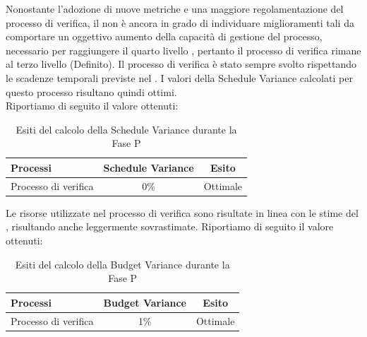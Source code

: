 	Nonostante l'adozione di nuove metriche e una maggiore regolamentazione del processo di verifica, il  non è ancora in grado di individuare miglioramenti tali da comportare un oggettivo aumento della capacità di gestione del processo, necessario per raggiungere il quarto livello , pertanto il processo di verifica rimane al terzo livello (Definito).
	Il processo di verifica è stato sempre svolto rispettando le scadenze temporali previste nel . I valori della Schedule Variance calcolati per questo processo risultano quindi ottimi.\\
			Riportiamo di seguito il valore ottenuti:
			\begin{table}[H]
				\centering
				\begin{tabu}{| l | c | c |}
					\hline
						Processi 							& Schedule Variance	& Esito		\\ \hline \hline
						Processo di verifica & 0\% & Ottimale \\ \hline
				\end{tabu}
				\caption{Esiti del calcolo della Schedule Variance durante la Fase P}
			\end{table}	

Le risorse utilizzate nel processo di verifica sono risultate in linea con le stime del , risultando anche leggermente sovrastimate.
Riportiamo di seguito il valore ottenuti:
\begin{table}[H]
	\centering
	\begin{tabu}{| l | c | c |}
	\hline
	Processi 							& Budget Variance	& Esito		\\ \hline \hline
	Processo di verifica & 1\% & Ottimale \\ \hline
	\end{tabu}
	\caption{Esiti del calcolo della Budget Variance durante la Fase P}
\end{table}	

